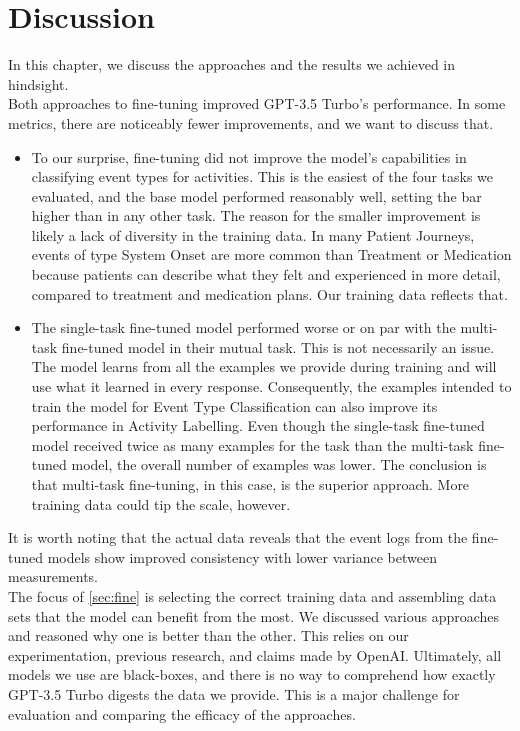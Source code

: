 \section{Discussion}\label{sec:discussion}
In this chapter, we discuss the approaches and the results we achieved in hindsight.\\
Both approaches to fine-tuning improved GPT-3.5 Turbo's performance. In some metrics, there are noticeably fewer improvements, and we want to discuss that.\\
\begin{itemize}[partopsep=0pt, topsep=0pt]
    \item To our surprise, fine-tuning did not improve the model's capabilities in classifying event types for activities. This is the easiest of the four tasks we evaluated, and the base model performed reasonably well, setting the bar higher than in any other task. The reason for the smaller improvement is likely a lack of diversity in the training data. In many Patient Journeys, events of type System Onset are more common than Treatment or Medication because patients can describe what they felt and experienced in more detail, compared to treatment and medication plans. Our training data reflects that.
    \item The single-task fine-tuned model performed worse or on par with the multi-task fine-tuned model in their mutual task. This is not necessarily an issue. The model learns from all the examples we provide during training and will use what it learned in every response. Consequently, the examples intended to train the model for Event Type Classification can also improve its performance in Activity Labelling. Even though the single-task fine-tuned model received twice as many examples for the task  than the multi-task fine-tuned model, the overall number of examples was lower. The conclusion is that multi-task fine-tuning, in this case, is the superior approach. More training data could tip the scale, however.
\end{itemize}
It is worth noting that the actual data reveals that the event logs from the fine-tuned models show improved consistency with lower variance between measurements.\\
The focus of \autoref{sec:fine} is selecting the correct training data and assembling data sets that the model can benefit from the most. We discussed various approaches and reasoned why one is better than the other. This relies on our experimentation, previous research, and claims made by OpenAI. Ultimately, all models we use are black-boxes, and there is no way to comprehend how exactly GPT-3.5 Turbo digests the data we provide. This is a major challenge for evaluation and comparing the efficacy of the approaches.